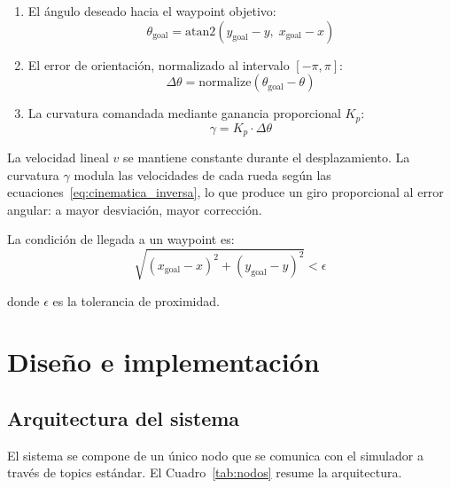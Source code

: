 \documentclass[12pt]{article}
\begin{document}
\begin{enumerate}[leftmargin=2em]
  \item El \'{a}ngulo deseado hacia el waypoint objetivo:
  \begin{equation}
    \theta_\text{goal} = \text{atan2}(y_\text{goal} - y, \; x_\text{goal} - x)
    \label{eq:theta_goal}
  \end{equation}

  \item El error de orientaci\'{o}n, normalizado al intervalo $[-\pi, \pi]$:
  \begin{equation}
    \Delta\theta = \text{normalize}(\theta_\text{goal} - \theta)
    \label{eq:error_theta}
  \end{equation}

  \item La curvatura comandada mediante ganancia proporcional $K_p$:
  \begin{equation}
    \gamma = K_p \cdot \Delta\theta
    \label{eq:curvatura}
  \end{equation}
\end{enumerate}

La velocidad lineal $v$ se mantiene constante durante el desplazamiento. La curvatura $\gamma$ modula las velocidades de cada rueda seg\'{u}n las ecuaciones~\eqref{eq:cinematica_inversa}, lo que produce un giro proporcional al error angular: a mayor desviaci\'{o}n, mayor correcci\'{o}n.

La condici\'{o}n de llegada a un waypoint es:
\begin{equation}
  \sqrt{(x_\text{goal} - x)^2 + (y_\text{goal} - y)^2} < \epsilon
  \label{eq:tolerancia}
\end{equation}

donde $\epsilon$ es la tolerancia de proximidad.


\section{Dise\~{n}o e implementaci\'{o}n}

\subsection{Arquitectura del sistema}
El sistema se compone de un \'{u}nico nodo \ros{} que se comunica con el simulador \coppelia{} a trav\'{e}s de topics est\'{a}ndar. El Cuadro~\ref{tab:nodos} resume la arquitectura.
\end{document}
